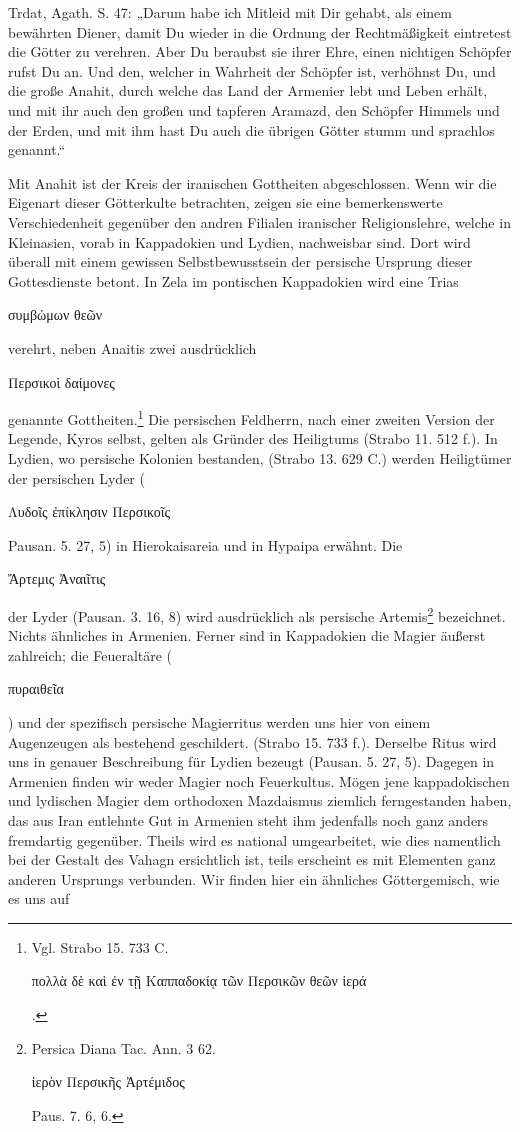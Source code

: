 \documentclass{article}
\begin{document}
Trdat, Agath. S. 47: „Darum habe ich Mitleid mit Dir gehabt, als einem bewährten Diener, damit Du wieder in die Ordnung der Rechtmäßigkeit eintretest die Götter zu verehren. Aber Du beraubst sie ihrer Ehre, einen nichtigen Schöpfer rufst Du an. Und den, welcher in Wahrheit der Schöpfer ist, verhöhnst Du, und die große Anahit, durch welche das Land der Armenier lebt und Leben erhält, und mit ihr auch den großen und tapferen Aramazd, den Schöpfer Himmels und der Erden, und mit ihm hast Du auch die übrigen Götter stumm und sprachlos genannt.“

Mit Anahit ist der Kreis der iranischen Gottheiten abgeschlossen. Wenn wir die Eigenart dieser Götterkulte betrachten, zeigen sie eine bemerkenswerte Verschiedenheit gegenüber den andren Filialen iranischer Religionslehre, welche in Kleinasien, vorab in Kappadokien und Lydien, nachweisbar sind. Dort wird überall mit einem gewissen Selbstbewusstsein der persische Ursprung dieser Gottesdienste betont. In Zela im pontischen Kappadokien wird eine Trias \begin{greek}συμβώμων θεῶν\end{greek} verehrt, neben Anaitis zwei ausdrücklich \begin{greek}Περσικοὶ δαίμονες\end{greek} genannte Gottheiten.\footnote{Vgl. Strabo 15. 733 C. \begin{greek}πολλὰ δὲ καὶ ἐν τῇ Καππαδοκίᾳ τῶν Περσικῶν θεῶν ἱερά\end{greek}.} Die persischen Feldherrn, nach einer zweiten Version der Legende, Kyros selbst, gelten als Gründer des Heiligtums (Strabo 11. 512 f.). In Lydien, wo persische Kolonien bestanden, (Strabo 13. 629 C.) werden Heiligtümer der persischen Lyder (\begin{greek}Λυδοῖς ἐπίκλησιν Περσικοῖς\end{greek} Pausan. 5. 27, 5) in Hierokaisareia und in Hypaipa erwähnt. Die \begin{greek}Ἄρτεμις Ἀναιῖτις\end{greek} der Lyder (Pausan. 3. 16, 8) wird ausdrücklich als persische Artemis\footnote{Persica Diana Tac. Ann. 3 62. \begin{greek}ἱερὸν Περσικῆς Ἀρτέμιδος\end{greek} Paus. 7. 6, 6.} bezeichnet. Nichts ähnliches in Armenien. Ferner sind in Kappadokien die Magier äußerst zahlreich; die Feueraltäre (\begin{greek}πυραιθεῖα\end{greek}) und der spezifisch persische Magierritus werden uns hier von einem Augenzeugen als bestehend geschildert. (Strabo 15. 733 f.). Derselbe Ritus wird uns in genauer Beschreibung für Lydien bezeugt (Pausan. 5. 27, 5). Dagegen in Armenien finden wir weder Magier noch Feuerkultus. Mögen jene kappadokischen und lydischen Magier dem orthodoxen Mazdaismus ziemlich ferngestanden haben, das aus Iran entlehnte Gut in Armenien steht ihm jedenfalls noch ganz anders fremdartig gegenüber. Theils wird es national umgearbeitet, wie dies namentlich bei der Gestalt des Vahagn ersichtlich ist, teils erscheint es mit Elementen ganz anderen Ursprungs verbunden. Wir finden hier ein ähnliches Göttergemisch, wie es uns auf 
\end{document}
